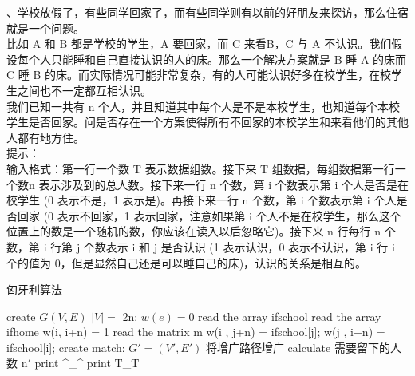 \documentclass[a4paper, 10pt]{ctexart} %
\begin{document}
、学校放假了，有些同学回家了，而有些同学则有以前的好朋友来探访，那么住宿就是一个问题。\\
比如 A 和 B 都是学校的学生，A 要回家，而 C 来看B，C 与 A 不认识。我们假设每个人只能睡和自己直接认识的人的床。那么一个解决方案就是 B 睡 A 的床而 C 睡 B 的床。而实际情况可能非常复杂，有的人可能认识好多在校学生，在校学生之间也不一定都互相认识。\\
我们已知一共有 n 个人，并且知道其中每个人是不是本校学生，也知道每个本校学生是否回家。问是否存在一个方案使得所有不回家的本校学生和来看他们的其他人都有地方住。\\
提示：\\
输入格式：第一行一个数 T 表示数据组数。接下来 T 组数据，每组数据第一行一个数n 表示涉及到的总人数。接下来一行 n 个数，第 i 个数表示第 i 个人是否是在校学生 (0 表示不是，1 表示是)。再接下来一行 n 个数，第 i 个数表示第 i 个人是否回家 (0 表示不回家，1 表示回家，注意如果第 i 个人不是在校学生，那么这个位置上的数是一个随机的数，你应该在读入以后忽略它)。接下来 n 行每行 n 个数，第 i 行第 j 个数表示 i 和 j 是否认识 (1 表示认识，0 表示不认识，第 i 行 i 个的值为 0，但是显然自己还是可以睡自己的床)，认识的关系是相互的。\\
\begin{algorithm}
    \caption{匈牙利算法}
    \begin{algorithmic}[1]
        \State create $G\left(V,E\right)$ 
        \State $|V|=$ 2n; $w \left(e\right) = 0$
        \State read the array ifschool 
        \State read the array ifhome 
        \State w(i, i+n) = 1
        \EndIf
        \State read the matrix m 
        \State w(i , j+n) = ifschool[j]; 
        \State w(j , i+n) = ifschool[i]; 
        \EndFor 
        \State create match: $G' = \left(V' , E'\right)$
        \State 将增广路径增广
        \EndWhile
        \State calculate 需要留下的人数 n$'$
        \State print \^{}\_{}\^{}
        \Else 
        \State print T\_T
        \EndIf
    \end{algorithmic}
\end{algorithm}
\end{document}
